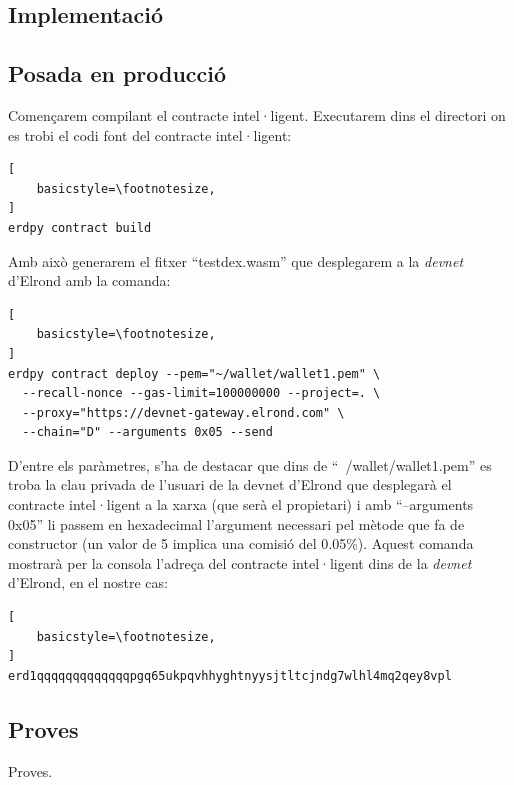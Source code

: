 \documentclass[11pt,a4paper]{article}
\begin{document}
\subsection{Implementació}

\subsection{Posada en producció}
Començarem compilant el contracte intel·ligent. Executarem dins el directori on es trobi el codi font del contracte intel·ligent:
\begin{lstlisting}[
    basicstyle=\footnotesize,
]
erdpy contract build
\end{lstlisting}

Amb això generarem el fitxer ``testdex.wasm'' que desplegarem a la \textit{devnet} d'Elrond amb la comanda:
\begin{lstlisting}[
    basicstyle=\footnotesize,
]
erdpy contract deploy --pem="~/wallet/wallet1.pem" \
  --recall-nonce --gas-limit=100000000 --project=. \
  --proxy="https://devnet-gateway.elrond.com" \
  --chain="D" --arguments 0x05 --send
\end{lstlisting}

D'entre els paràmetres, s'ha de destacar que dins de ``~/wallet/wallet1.pem'' es troba la clau privada de l'usuari de la devnet d'Elrond que desplegarà el contracte intel·ligent a la xarxa (que serà el propietari) i amb ``--arguments 0x05'' li passem en hexadecimal l'argument necessari pel mètode que fa de constructor (un valor de 5 implica una comisió del 0.05\%). Aquest comanda mostrarà per la consola l'adreça del contracte intel·ligent dins de la \textit{devnet} d'Elrond, en el nostre cas:
\begin{lstlisting}[
    basicstyle=\footnotesize,
]
erd1qqqqqqqqqqqqqpgq65ukpqvhhyghtnyysjtltcjndg7wlhl4mq2qey8vpl
\end{lstlisting}

\medskip

\subsection{Proves}
Proves.
\medskip 

\newpage 
\end{document}
